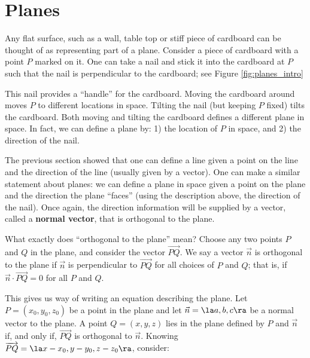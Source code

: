 \section{Planes}\label{sec:planes}

Any flat surface, such as a wall, table top or stiff piece of cardboard can be thought of as representing part of a plane. Consider a piece of cardboard with a point $P$ marked on it. One can take a nail and stick it into the cardboard at $P$ such that the nail is perpendicular to the cardboard; see Figure \ref{fig:planes_intro}%

This nail provides a ``handle'' for the cardboard. Moving the cardboard around moves $P$ to different locations in space. Tilting the nail (but keeping $P$ fixed) tilts the cardboard. Both moving and tilting the cardboard defines a different plane in space. In fact, we can define a plane by: 1) the location of $P$ in space, and 2) the direction of the nail.

The previous section showed that one can define a line given a point on the line and the direction of the line (usually given by a vector). One can make a similar statement about planes: we can define a plane in space given a point on the plane and the direction the plane ``faces'' (using the description above, the direction of the nail). Once again, the direction information will be supplied by a vector, called a \textbf{normal vector}, that is orthogonal to the plane.

What exactly does ``orthogonal to the plane'' mean? Choose any two points $P$ and $Q$ in the plane, and consider the vector $\overrightarrow{PQ}$. We say a vector $\vec n$ is orthogonal to the plane if $\vec n$ is perpendicular to $\overrightarrow{PQ}$ for all choices of $P$ and $Q$; that is, if $\vec n\cdot \overrightarrow{PQ}=0$ for all $P$ and $Q$.

This gives us way of writing an equation describing the plane. Let $P=(x_0,y_0,z_0)$ be a point in the plane and let $\vec n = \la a,b,c\ra $ be a normal vector to the plane. A point $Q = (x,y,z)$ lies in the plane defined by $P$ and $\vec n$ if, and only if, $\overrightarrow{PQ}$ is orthogonal to $\vec n$. Knowing $\overrightarrow{PQ} = \la x-x_0,y-y_0,z-z_0\ra$, consider:

